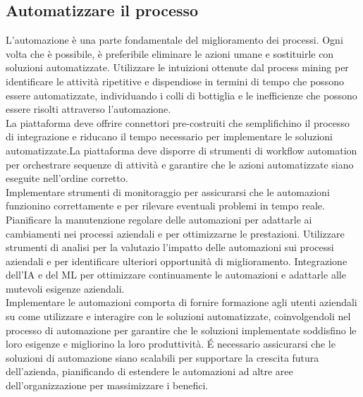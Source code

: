 \documentclass{article}
\begin{document}
\subsection{Automatizzare il processo}
L'automazione è una parte fondamentale del miglioramento dei processi. Ogni volta che è possibile, è preferibile eliminare le azioni umane e sostituirle con soluzioni automatizzate. Utilizzare le intuizioni ottenute dal process mining per identificare le attività ripetitive e dispendiose in termini di tempo che possono essere automatizzate, individuando i colli di bottiglia e le inefficienze che possono essere risolti attraverso l'automazione.\\
La piattaforma deve offrire connettori pre-costruiti che semplifichino il processo di integrazione e riducano il tempo necessario per implementare le soluzioni automatizzate.La piattaforma deve disporre di strumenti di workflow automation per orchestrare sequenze di attività e garantire che le azioni automatizzate siano eseguite nell'ordine corretto.\\
Implementare strumenti di monitoraggio per assicurarsi che le automazioni funzionino correttamente e per rilevare eventuali problemi in tempo reale. Pianificare la manutenzione regolare delle automazioni per adattarle ai cambiamenti nei processi aziendali e per ottimizzarne le prestazioni. Utilizzare strumenti di analisi per la valutazio l'impatto delle automazioni sui processi aziendali e per identificare ulteriori opportunità di miglioramento. Integrazione dell'IA e del ML per ottimizzare continuamente le automazioni e adattarle alle mutevoli esigenze aziendali.\\
Implementare le automazioni comporta di fornire formazione agli utenti aziendali su come utilizzare e interagire con le soluzioni automatizzate, coinvolgendoli nel processo di automazione per garantire che le soluzioni implementate soddisfino le loro esigenze e migliorino la loro produttività. É necessario assicurarsi che le soluzioni di automazione siano scalabili per supportare la crescita futura dell'azienda, pianificando di estendere le automazioni ad altre aree dell'organizzazione per massimizzare i benefici.
\end{document}
